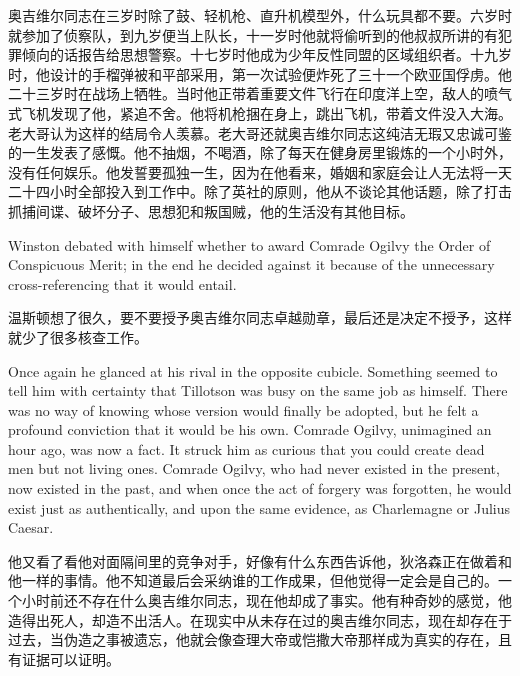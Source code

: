 \begin{paracol}{2}
\switchcolumn

奥吉维尔同志在三岁时除了鼓、轻机枪、直升机模型外，什么玩具都不要。六岁时就参加了侦察队，到九岁便当上队长，十一岁时他就将偷听到的他叔叔所讲的有犯罪倾向的话报告给思想警察。十七岁时他成为少年反性同盟的区域组织者。十九岁时，他设计的手榴弹被和平部采用，第一次试验便炸死了三十一个欧亚国俘虏。他二十三岁时在战场上牺牲。当时他正带着重要文件飞行在印度洋上空，敌人的喷气式飞机发现了他，紧追不舍。他将机枪捆在身上，跳出飞机，带着文件没入大海。老大哥认为这样的结局令人羡慕。老大哥还就奥吉维尔同志这纯洁无瑕又忠诚可鉴的一生发表了感慨。他不抽烟，不喝酒，除了每天在健身房里锻炼的一个小时外，没有任何娱乐。他发誓要孤独一生，因为在他看来，婚姻和家庭会让人无法将一天二十四小时全部投入到工作中。除了英社的原则，他从不谈论其他话题，除了打击抓捕间谍、破坏分子、思想犯和叛国贼，他的生活没有其他目标。

\switchcolumn*

Winston debated with himself whether to award Comrade Ogilvy the Order
of Conspicuous Merit; in the end he decided against it because of the
unnecessary cross-referencing that it would entail.

\switchcolumn

温斯顿想了很久，要不要授予奥吉维尔同志卓越勋章，最后还是决定不授予，这样就少了很多核查工作。

\switchcolumn*

Once again he glanced at his rival in the opposite cubicle. Something
seemed to tell him with certainty that Tillotson was busy on the same
job as himself. There was no way of knowing whose version would finally
be adopted, but he felt a profound conviction that it would be his own.
Comrade Ogilvy, unimagined an hour ago, was now a fact. It struck him as
curious that you could create dead men but not living ones. Comrade
Ogilvy, who had never existed in the present, now existed in the past,
and when once the act of forgery was forgotten, he would exist just as
authentically, and upon the same evidence, as Charlemagne or Julius
Caesar.

\switchcolumn

他又看了看他对面隔间里的竞争对手，好像有什么东西告诉他，狄洛森正在做着和他一样的事情。他不知道最后会采纳谁的工作成果，但他觉得一定会是自己的。一个小时前还不存在什么奥吉维尔同志，现在他却成了事实。他有种奇妙的感觉，他造得出死人，却造不出活人。在现实中从未存在过的奥吉维尔同志，现在却存在于过去，当伪造之事被遗忘，他就会像查理大帝或恺撒大帝那样成为真实的存在，且有证据可以证明。

\switchcolumn*



\end{paracol}
